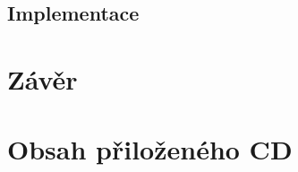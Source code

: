 \documentclass[11pt,twoside,a4paper]{book}
\begin{document}
	\section{Implementace} %
		

\chapter{Závěr}
		




{

}


\appendix	

\printnomenclature
\label{apx:zkratky}

\chapter{Obsah přiloženého CD}
\end{document}
